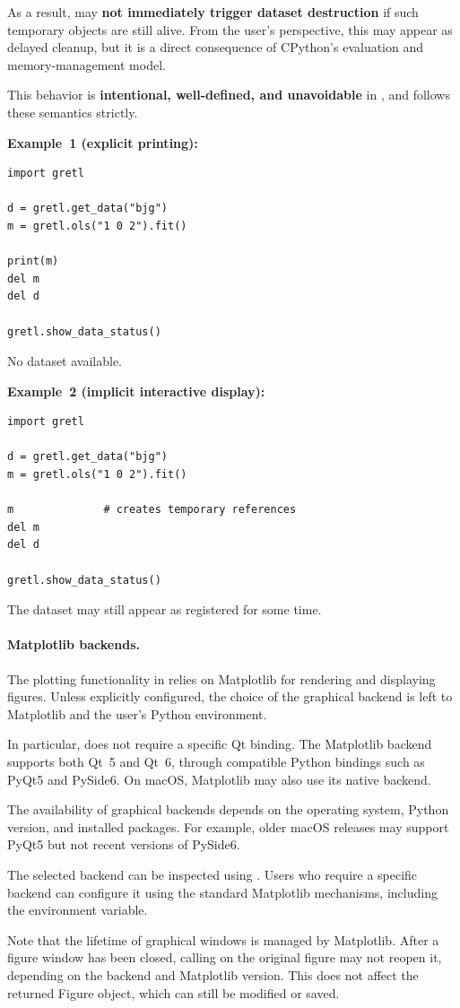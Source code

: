 As a result,  may \textbf{not immediately trigger
	dataset destruction} if such temporary objects are still alive.
From the user's perspective, this may appear as delayed cleanup,
but it is a direct consequence of CPython's evaluation and
memory-management model.

This behavior is \textbf{intentional, well-defined, and unavoidable}
in \python, and \gretlpy follows these semantics strictly.\newline

\noindent\textbf{Example~1 (explicit printing):}
\begin{lstlisting}[style=pythonstylefoot]
import gretl

d = gretl.get_data("bjg")
m = gretl.ols("1 0 2").fit()

print(m)
del m
del d

gretl.show_data_status()
\end{lstlisting}
No dataset available.\newline

\noindent\textbf{Example~2 (implicit interactive display):}
\begin{lstlisting}[style=pythonstylefoot]
import gretl

d = gretl.get_data("bjg")
m = gretl.ols("1 0 2").fit()

m              # creates temporary references
del m
del d

gretl.show_data_status()
\end{lstlisting}
The dataset may still appear as registered for some time.

\paragraph{Matplotlib backends.}
The plotting functionality in \gretlpy relies on Matplotlib
for rendering and displaying figures. Unless explicitly
configured, the choice of the graphical backend is left
to Matplotlib and the user's Python environment.

In particular, \gretlpy does not require a specific Qt
binding. The Matplotlib  backend supports
both Qt~5 and Qt~6, through compatible Python bindings
such as PyQt5 and PySide6. On macOS, Matplotlib may also
use its native  backend.

The availability of graphical backends depends on the
operating system, Python version, and installed packages.
For example, older macOS releases may support PyQt5 but
not recent versions of PySide6.

The selected backend can be inspected using
. Users who require a
specific backend can configure it using the standard
Matplotlib mechanisms, including the 
environment variable.

Note that the lifetime of graphical windows is managed
by Matplotlib. After a figure window has been closed,
calling  on the original figure
may not reopen it, depending on the backend and Matplotlib
version. This does not affect the returned Figure object,
which can still be modified or saved.
